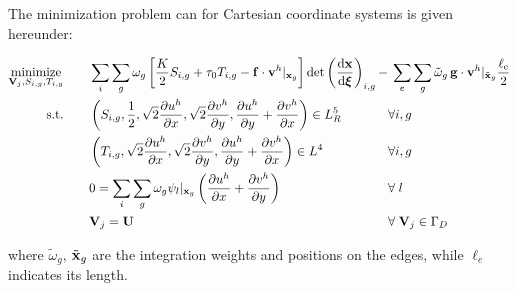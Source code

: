 \documentclass[11 pt]{report}
\begin{document}
\pagebreak
The minimization problem can for Cartesian coordinate systems is given hereunder:%
\begin{empheqboxed}
    \begin{equation}
        \begin{alignedat}{3}
            \operatorname*{minimize}_{\mathbf{V}_j, S_{i,g}, T_{i,g}} &\qquad \sum_{i}\sum_{g} \omega_g \left[\frac{K}{2} S_{i,g} + \tau_0 T_{i,g} - \mathbf{f} \cdot \mathbf{v}^h \vert_{\mathbf{x}_g} \right] \det \left(\dv{\mathbf{x}}{\boldsymbol \xi}\right)_{i,g}
            - && \: \sum_{e}\sum_{g} \tilde \omega_g \,\mathbf{g}\cdot \mathbf{v}^h\vert_{\tilde {\mathbf{x}}_g} \frac{\ell_{\text{e}}}{2}\\
            \textrm{s.t.} &\qquad \left(S_{i,g}, \frac{1}{2}, \sqrt{2}\pdv{u^h}{x}, \sqrt{2}\pdv{v^h}{y}, \pdv{u^h}{y}+\pdv{v^h}{x}\right) \in L_R^5 && \forall i, g\\
            &\qquad \left(T_{i,g}, \sqrt{2}\pdv{u^h}{x}, \sqrt{2}\pdv{v^h}{y}, \pdv{u^h}{y}+\pdv{v^h}{x}\right) \in L^4 && \forall i, g\\
            &\qquad 0 = \sum_i \sum_g \omega_g \psi_l \vert_{\mathbf{x}_g} \left(\pdv{u^h}{x} + \pdv{v^h}{y}\right) && \forall\; l\\
            &\qquad \mathbf{V}_{j} = \mathbf{U} && \forall\; \mathbf{V}_{j} \in \Gamma_D
        \end{alignedat}
    \end{equation}
\end{empheqboxed}
where $\tilde \omega_g$, $\tilde {\mathbf{x}}_g$ are the integration weights and positions on the edges, while $\ell_e$ indicates its length.
\end{document}
